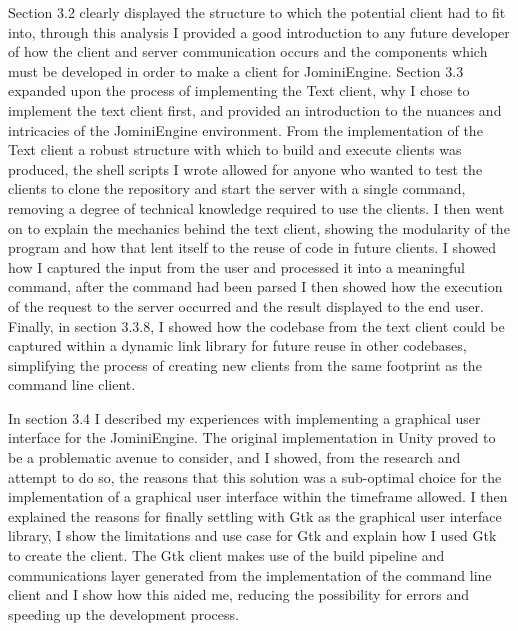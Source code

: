 \documentclass{article}
\begin{document}
Section 3.2 clearly displayed the structure to which the potential client had to fit into, through this analysis I provided a good introduction to any future developer of how the client and server communication occurs and the components which must be developed in order to make a client for JominiEngine. Section 3.3 expanded upon the process of implementing the Text client, why I chose to implement the text client first, and provided an introduction to the nuances and intricacies of the JominiEngine environment. From the implementation of the Text client a robust structure with which to build and execute clients was produced, the shell scripts I wrote allowed for anyone who wanted to test the clients to clone the repository and start the server with a single command, removing a degree of technical knowledge required to use the clients. I then went on to explain the mechanics behind the text client, showing the modularity of the program and how that lent itself to the reuse of code in future clients. I showed how I captured the input from the user and processed it into a meaningful command, after the command had been parsed I then showed how the execution of the request to the server occurred and the result displayed to the end user. Finally, in section 3.3.8, I showed how the codebase from the text client could be captured within a dynamic link library for future reuse in other codebases, simplifying the process of creating new clients from the same footprint as the command line client.

In section 3.4 I described my experiences with implementing a graphical user interface for the JominiEngine. The original implementation in Unity proved to be a problematic avenue to consider, and I showed, from the research and attempt to do so, the reasons that this solution was a sub-optimal choice for the implementation of a graphical user interface within the timeframe allowed. I then explained the reasons for finally settling with Gtk as the graphical user interface library, I show the limitations and use case for Gtk and explain how I used Gtk to create the client. The Gtk client makes use of the build pipeline and communications layer generated from the implementation of the command line client and I show how this aided me, reducing the possibility for errors and speeding up the development process.
\end{document}
